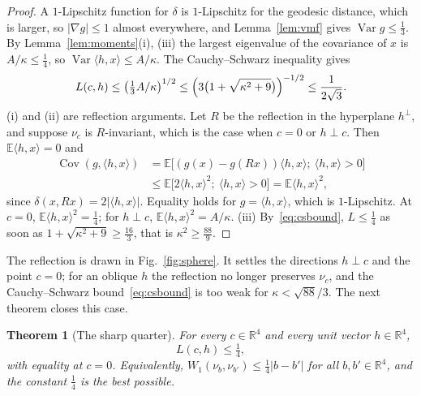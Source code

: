 \documentclass[aps,prd,twocolumn,superscriptaddress,nofootinbib,longbibliography,floatfix,amsmath,amssymb,10pt]{revtex4-2}
\newtheorem{theorem}{Theorem}
\theoremstyle{definition}
\theoremstyle{remark}
\newcommand{\R}{\mathbb{R}}
\newcommand{\E}{\mathbb{E}}
\newcommand{\Cov}{\operatorname{Cov}}
\newcommand{\Var}{\operatorname{Var}}
\newcommand{\ip}[2]{\langle #1,#2\rangle}
\begin{document}
\begin{proof}
A $1$-Lipschitz function for $\delta$ is $1$-Lipschitz for the geodesic
distance, which is larger, so $|\nabla g|\le1$ almost everywhere, and
Lemma~\ref{lem:vmf} gives $\Var g\le\frac13$. By Lemma~\ref{lem:moments}(i),
(iii) the largest eigenvalue of the covariance of $x$ is $A/\kappa\le\frac14$,
so $\Var\ip hx\le A/\kappa$. The Cauchy--Schwarz inequality gives
\begin{equation}\label{eq:csbound}
L(c,h)\le\bigl(\tfrac13A/\kappa\bigr)^{1/2}\le\Bigl(3\bigl(1+
\sqrt{\kappa^2+9}\bigr)\Bigr)^{-1/2}\le\frac1{2\sqrt3}.
\end{equation}
(i) and (ii) are reflection arguments. Let $R$ be the reflection in the
hyperplane $h^\perp$, and suppose $\nu_c$ is $R$-invariant, which is the case
when $c=0$ or $h\perp c$. Then $\E\ip hx=0$ and
\[
\begin{aligned}
\Cov(g,\ip hx)&=\E\bigl[(g(x)-g(Rx))\ip hx;\ \ip hx>0\bigr]\\
&\le\E\bigl[2\ip hx^2;\ \ip hx>0\bigr]=\E\ip hx^2,
\end{aligned}
\]
since $\delta(x,Rx)=2|\ip hx|$. Equality holds for $g=\ip hx$, which is
$1$-Lipschitz. At $c=0$, $\E\ip hx^2=\frac14$; for $h\perp c$, $\E\ip
hx^2=A/\kappa$. (iii) By~\eqref{eq:csbound}, $L\le\frac14$ as soon as
$1+\sqrt{\kappa^2+9}\ge\frac{16}3$, that is $\kappa^2\ge\frac{88}9$.
\end{proof}

The reflection is drawn in Fig.~\ref{fig:sphere}. It settles the directions
$h\perp c$ and the point $c=0$; for an oblique $h$ the reflection no longer
preserves $\nu_c$, and the Cauchy--Schwarz bound~\eqref{eq:csbound} is too
weak for $\kappa<\sqrt{88}/3$. The next theorem closes this case.

\begin{theorem}[The sharp quarter]\label{thm:quarter}
For every $c\in\R^4$ and every unit vector $h\in\R^4$,
\[
L(c,h)\le\tfrac14 ,
\]
with equality at $c=0$. Equivalently, $W_1(\nu_b,\nu_{b'})\le\frac14|b-b'|$
for all $b,b'\in\R^4$, and the constant $\frac14$ is the best possible.
\end{theorem}
\end{document}
